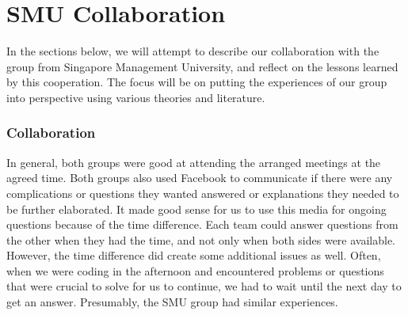 \part{SMU Collaboration} \label{SmuCollaboration}
In the sections below, we will attempt to describe our collaboration with the group from Singapore Management University, and reflect on the lessons learned by this cooperation. The focus will be on putting the 
experiences of our group into perspective using various theories and literature.

\section{Collaboration}
In general, both groups were good at attending the arranged meetings at the agreed time.
Both groups also used Facebook to communicate if there were any complications or questions they wanted answered or explanations they needed to be further elaborated. It made good sense for us to use this media for ongoing questions because of the time difference. Each team could answer questions from the other when they had the time, and not only when both sides were available. However, the time difference did create some additional issues as well. Often, when we were coding in the afternoon and encountered problems or questions that were crucial to solve for us to continue, we had to wait until the next day to get an answer. Presumably, the SMU group had similar experiences.
